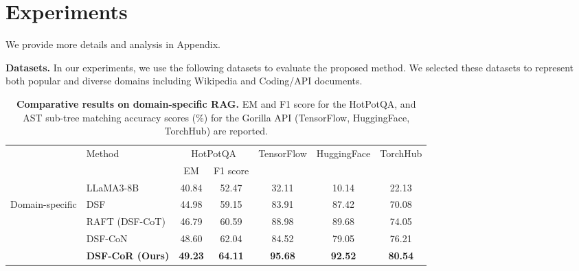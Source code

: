 \section{Experiments}
We provide more details and analysis in Appendix.

\noindent \textbf{Datasets.}
In our experiments, we use the following datasets to evaluate the proposed method. We selected these datasets to represent both popular and diverse domains including Wikipedia and Coding/API documents. 


\begin{table*}[t]
  \centering
  \begin{adjustbox}{width=0.8\linewidth}
  \begin{tabular}{@{}clccccc@{}}
    \toprule
    & \multirow{2}{*}{Method}      &      \multicolumn{2}{c}{HotPotQA}      &      \multirow{2}{*}{TensorFlow}    &      \multirow{2}{*}{HuggingFace}      &      \multirow{2}{*}{TorchHub} \\
    \cmidrule(ll){3-4}
    && EM& F1 score& & & \\ 
    \midrule
    & LLaMA3-8B & 40.84 & 52.47 & 32.11 & 10.14 & 22.13 \\
    \midrule
    \multirow{4}{*}{Domain-specific} & DSF & 44.98 & 59.15 & 83.91 & 87.42 & 70.08\\
    & RAFT (DSF-CoT) & 46.79 & 60.59 & 88.98 & 89.68 & 74.05\\
    & DSF-CoN & 48.60 & 62.04 & 84.52 & 79.05 & 76.21 \\
    \cmidrule(ll){2-7}
    & \textbf{DSF-CoR (Ours)} & \textbf{49.23} & \textbf{64.11} & \textbf{95.68} & \textbf{92.52} & \textbf{80.54} \\

    \bottomrule
    
  \end{tabular}
  \end{adjustbox}
  \caption{\textbf{Comparative results on domain-specific RAG.} EM and F1 score for the HotPotQA, and AST sub-tree matching accuracy scores (\%) for the Gorilla API (TensorFlow, HuggingFace, TorchHub) are reported.}
  \label{tab:main}
\end{table*}

